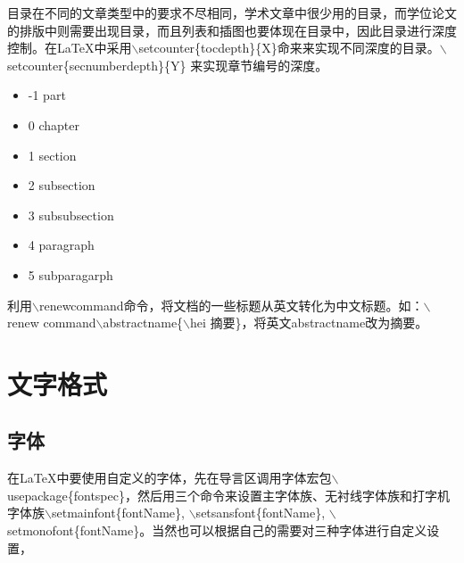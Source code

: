 \documentclass[12pt]{book}
\begin{document}
目录在不同的文章类型中的要求不尽相同，学术文章中很少用的目录，而学位论文的排版中则需要出现目录，而且列表和插图也要体现在目录中，因此目录进行深度控制。在\LaTeX{}中采用$\backslash$setcounter\{tocdepth\}\{X\}命来来实现不同深度的目录。$\backslash$setcounter\{secnumberdepth\}\{Y\} 来实现章节编号的深度。

\begin{center}
     \begin{itemize}
          \item -1 part                    
          \item  0 chapter               
          \item  1 section                
          \item  2 subsection          
          \item  3 subsubsection     
          \item  4 paragraph            
          \item  5 subparagarph   
      \end{itemize}
\end{center}


利用$\backslash$renewcommand命令，将文档的一些标题从英文转化为中文标题。如：$\backslash$renew command$\backslash$abstractname\{$\backslash$hei 摘要\}，将英文abstractname改为摘要。

%


\section{文字格式}

\subsection{字体}

在LaTeX中要使用自定义的字体，先在导言区调用字体宏包$\backslash$usepackage\{fontspec\}，然后用三个命令来设置主字体族、无衬线字体族和打字机字体族$\backslash$setmainfont\{fontName\}, $\backslash$setsansfont\{fontName\}, $\backslash$setmonofont\{fontName\}。当然也可以根据自己的需要对三种字体进行自定义设置，
\end{document}
